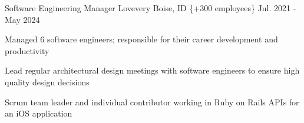 \cventry
{Software Engineering Manager} %
{Lovevery} %
{Boise, ID \{+300 employees\}} %
{Jul. 2021 - May 2024} %
{
  \begin{cvitems} %
    \item {Managed 6 software engineers; responsible for their career development and productivity}
    \item {Lead regular architectural design meetings with software engineers to ensure high quality design decisions}
    \item {Scrum team leader and individual contributor working in Ruby on Rails APIs for an iOS application}
  \end{cvitems}
}